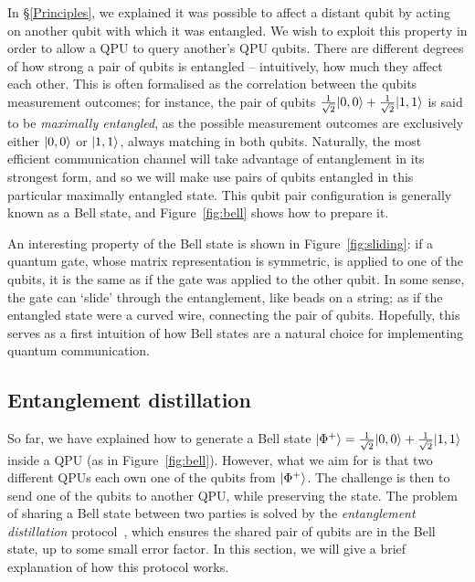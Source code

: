 In \S\ref{Principles}, we explained it was possible to affect a distant qubit by acting on another qubit with which it was entangled. We wish to exploit this property in order to allow a QPU to query another's QPU qubits. There are different degrees of how strong a pair of qubits is entangled -- intuitively, how much they affect each other. This is often formalised as the correlation between the qubits measurement outcomes; for instance, the pair of qubits \(\frac{1}{\sqrt{2}}\vert 0,0 \rangle + \frac{1}{\sqrt{2}}\vert 1,1 \rangle\) is said to be \textit{maximally entangled}, as the possible measurement outcomes are exclusively either \(\vert 0,0 \rangle\) or \(\vert 1,1 \rangle\), always matching in both qubits. Naturally, the most efficient communication channel will take advantage of entanglement in its strongest form, and so we will make use pairs of qubits entangled in this particular maximally entangled state. This qubit pair configuration is generally known as a Bell state, and Figure~\ref{fig:bell} shows how to prepare it.



An interesting property of the Bell state is shown in Figure~\ref{fig:sliding}: if a quantum gate, whose matrix representation is symmetric, is applied to one of the qubits, it is the same as if the gate was applied to the other qubit. In some sense, the gate can `slide' through the entanglement, like beads on a string; as if the entangled state were a curved wire, connecting the pair of qubits. Hopefully, this serves as a first intuition of how Bell states are a natural choice for implementing quantum communication.



\subsection{Entanglement distillation}
\label{Distillation}

So far, we have explained how to generate a Bell state \(\vert \Phi^+ \rangle = \frac{1}{\sqrt{2}}\vert 0,0 \rangle + \frac{1}{\sqrt{2}}\vert 1,1 \rangle\) inside a QPU (as in Figure~\ref{fig:bell}). However, what we aim for is that two different QPUs each own one of the qubits from \(\vert \Phi^+ \rangle\). The challenge is then to send one of the qubits to another QPU, while preserving the state. The problem of sharing a Bell state between two parties is solved by the \textit{entanglement distillation} protocol~\citep{DistillationProtocol}, which ensures the shared pair of qubits are in the Bell state, up to some small error factor. In this section, we will give a brief explanation of how this protocol works.

